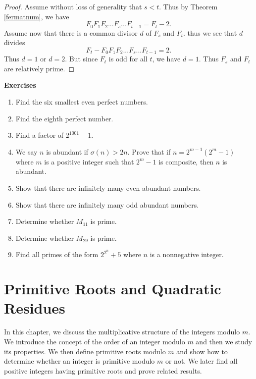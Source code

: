 \documentclass[12pt,letterpaper]{book}
\begin{document}
\begin{proof}
Assume without loss of generality that $s<t$.  Thus by Theorem \ref{fermatnum},
we have
\begin{equation*}
F_0F_1F_2...F_s...F_{t-1}=F_t-2.
\end{equation*}
Assume now that there is a common divisor $d$ of $F_s$ and $F_t$.
thus we see that $d$ divides
\begin{equation*}
F_t-F_0F_1F_2...F_s...F_{t-1}=2.
\end{equation*}
Thus $d=1$ or $d=2$.  But since $F_t$ is odd for all $t$, we have
$d=1$. Thus $F_s$ and $F_t$ are relatively prime.
\end{proof}
\textbf{Exercises}
\begin{enumerate}
\item{Find the six smallest even perfect numbers.}\item{Find the
eighth perfect number.}\item{Find a factor of $2^{1001}-1$.}\item{We
say $n$ is abundant if $\sigma(n)>2n$. Prove that if
$n=2^{m-1}(2^m-1)$ where $m$ is a positive integer such that $2^m-1$
is composite, then $n$ is abundant.}\item{Show that there are
infinitely many even abundant numbers.}\item{Show that there are
infinitely many odd abundant numbers.}\item{Determine whether
$M_{11}$ is prime.}\item{Determine whether $M_{29}$ is
prime.}\item{Find all primes of the form $2^{2^n}+5$ where $n$ is a
nonnegative integer.}
\end{enumerate}







\chapter{Primitive Roots and Quadratic Residues}
 \par  In this chapter, we discuss the multiplicative
structure of the integers modulo $m$.  We introduce the concept of
the order of an integer modulo $m$ and then we study its properties. We
then define primitive roots modulo $m$ and show how to determine
whether an integer is primitive modulo $m$ or not.  We later find
all positive integers having primitive roots and prove related
results.
\end{document}
